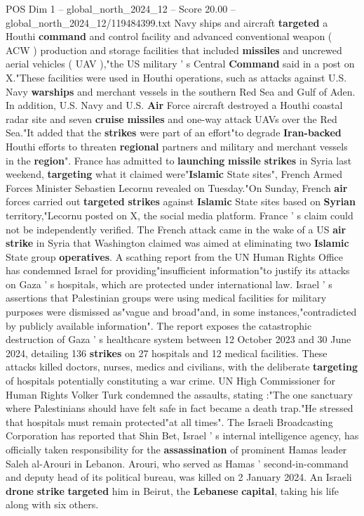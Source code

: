 \begin{textsample}{POS Dim 1 – global\_north\_2024\_12 – Score 20.00 – global\_north\_2024\_12/119484399.txt}
Navy ships and aircraft \textbf{targeted} a Houthi \textbf{command} and control facility and advanced conventional weapon ( ACW ) production and storage facilities that included \textbf{missiles} and uncrewed aerial vehicles ( UAV ),"the US military ' s Central \textbf{Command} said in a post on X."These facilities were used in Houthi operations, such as attacks against U.S.
Navy \textbf{warships} and merchant vessels in the southern Red Sea and Gulf of Aden.
In addition, U.S.
Navy and U.S. \textbf{Air} Force aircraft destroyed a Houthi coastal radar site and seven \textbf{cruise} \textbf{missiles} and one-way attack UAVs over the Red Sea."It added that the \textbf{strikes} were part of an effort"to degrade \textbf{Iran-backed} Houthi efforts to threaten \textbf{regional} partners and military and merchant vessels in the \textbf{region}".
France has admitted to \textbf{launching} \textbf{missile} \textbf{strikes} in Syria last weekend, \textbf{targeting} what it claimed were"\textbf{Islamic} State sites", French Armed Forces Minister Sebastien Lecornu revealed on Tuesday."On Sunday, French \textbf{air} forces carried out \textbf{targeted} \textbf{strikes} against \textbf{Islamic} State sites based on \textbf{Syrian} territory,"Lecornu posted on X, the social media platform.
France ' s claim could not be independently verified.
The French attack came in the wake of a US \textbf{air} \textbf{strike} in Syria that Washington claimed was aimed at eliminating two \textbf{Islamic} State group \textbf{operatives}.
A scathing report from the UN Human Rights Office has condemned Israel for providing"insufficient information"to justify its attacks on Gaza ' s hospitals, which are protected under international law.
Israel ' s assertions that Palestinian groups were using medical facilities for military purposes were dismissed as"vague and broad"and, in some instances,"contradicted by publicly available information".
The report exposes the catastrophic destruction of Gaza ' s healthcare system between 12 October 2023 and 30 June 2024, detailing 136 \textbf{strikes} on 27 hospitals and 12 medical facilities.
These attacks killed doctors, nurses, medics and civilians, with the deliberate \textbf{targeting} of hospitals potentially constituting a war crime.
UN High Commissioner for Human Rights Volker Turk condemned the assaults, stating :"The one sanctuary where Palestinians should have felt safe in fact became a death trap."He stressed that hospitals must remain protected"at all times".
The Israeli Broadcasting Corporation has reported that Shin Bet, Israel ' s internal intelligence agency, has officially taken responsibility for the \textbf{assassination} of prominent Hamas leader Saleh al-Arouri in Lebanon.
Arouri, who served as Hamas ' second-in-command and deputy head of its political bureau, was killed on 2 January 2024.
An Israeli \textbf{drone} \textbf{strike} \textbf{targeted} him in Beirut, the \textbf{Lebanese} \textbf{capital}, taking his life along with six others.

\end{textsample}
